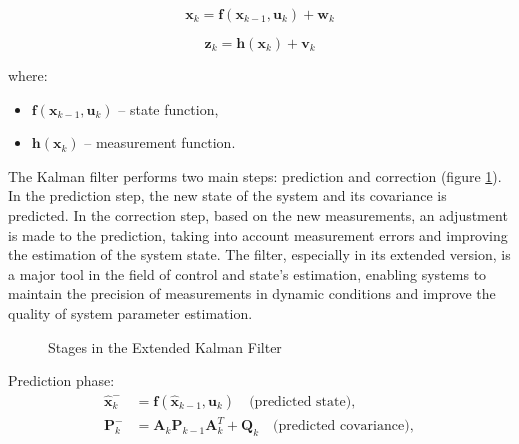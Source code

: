 \begin{equation}
	\bm{x}_k =  \bm{f} \left( \bm{x}_{k-1},  \bm{u}_k \right) + \bm{w}_k
	\label{ekf1}
\end{equation}

\begin{equation}
	\bm{z}_k = \bm{h} \left(\bm{x}_k \right) + \bm{v}_k
	\label{ekf2}
\end{equation}


where:
\begin{itemize}
	\item $\bm{f} \left( \bm{x}_{k-1},  \bm{u}_k \right)$ -- state function, 
	\item $\bm{h} \left(\bm{x}_k \right)$ -- measurement function.
\end{itemize}

The Kalman filter performs two main steps: prediction and correction (figure \ref{kf_diagram}). In the prediction step, the new state of the system and its covariance is predicted. In the correction step, based on the new measurements, an adjustment is made to the prediction, taking into account measurement errors and improving the estimation of the system state. The filter, especially in its extended version, is a major tool in the field of control and state's estimation, enabling systems to maintain the precision of measurements in dynamic conditions and improve the quality of system parameter estimation.\\


\begin{figure}[!h]
	\centering
	\caption{Stages in the Extended Kalman Filter}
	\label{kf_diagram}
\end{figure}

Prediction phase:
\begin{align}
	\bm{\hat{x}}_k^- & = \bm{f}(\bm{\hat{x}}_{k-1}, \bm{u}_k) \quad \text{(predicted state)}, \\
	\bm{P}_k^- & = \bm{A}_k \bm{P}_{k-1} \bm{A}_k^T + \bm{Q}_k \quad \text{(predicted covariance)},
\end{align}

